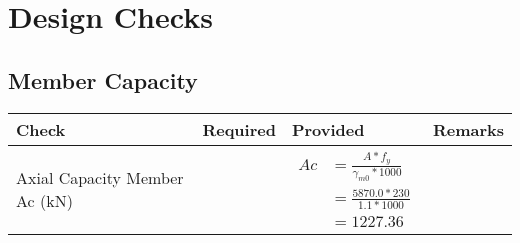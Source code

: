 \documentclass{article}%
\begin{document}
%
%
\section{Design Checks}%
\label{sec:DesignChecks}%
\subsection{Member Capacity}%
\label{subsec:MemberCapacity}%
\renewcommand{\arraystretch}{1.2}%
\begin{longtable}{|p{4cm}|p{5cm}|p{5.5cm}|p{1.5cm}|}%
\hline%
\rowcolor{OsdagGreen}%
Check&Required&Provided&Remarks\\%
\hline%
\endhead%
\hline%
Axial Capacity Member Ac (kN)&&$\begin{aligned} Ac &=\frac{A*f_y}{\gamma_{m0} *1000}\\ &=\frac{5870.0*230}{1.1* 1000}\\ &=1227.36\end{aligned}$&\\%
\hline%
\end{longtable}

%
\end{document}

